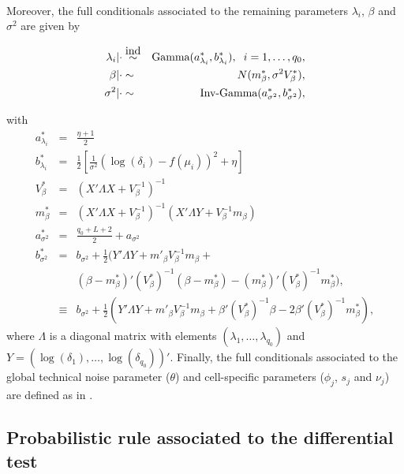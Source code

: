 \\

Moreover, the full conditionals associated to the remaining parameters $\lambda_i$, $\beta$ and $\sigma^2$ are given by 

\begin{eqnarray}
\lambda_i|\cdot & \stackrel{\mbox{ind}}{\sim} & \text{Gamma}(a^*_{\lambda_i},b^*_{\lambda_i}), \hspace{0.2cm} i = 1, \ldots, q_0, \\
\beta|\cdot & \sim & N(m^*_{\beta}, \sigma^2 V^*_{\beta}), \\
\sigma^2|\cdot & \sim & \text{Inv-Gamma}(a^*_{\sigma^2},b^*_{\sigma^2}),
\end{eqnarray} 

with \begin{eqnarray}
a^*_{\lambda_i} & = & \frac{\eta+1}{2} \\
b^*_{\lambda_i} & = & \frac{1}{2}\left[\frac{1}{\sigma^2}(\log(\delta_i)-f(\mu_i))^2+\eta\right] \\
V^*_{\beta} & = & (X' \Lambda X + V_\beta^{-1})^{-1} \\
m^*_{\beta} & = & (X' \Lambda X+V_\beta^{-1})^{-1}(X' \Lambda Y + V_\beta^{-1}m_\beta{}) \\
a^*_{\sigma^2} & = & \frac{q_0+L+2}{2}+a_{\sigma^2}\\
b^*_{\sigma^2} & = & b_{\sigma^2}+\frac{1}{2}(Y'\Lambda Y+ m'_{\beta} V_\beta^{-1} m_\beta+ \nonumber \\
&  &(\beta-m^*_{\beta})' (V^*_{\beta})^{-1} (\beta-m^*_{\beta}) - (m^*_{\beta})' (V^*_{\beta})^{-1} m^*_{\beta}),  \\
& \equiv & b_{\sigma^2}+\frac{1}{2}(Y'\Lambda Y+ m'_{\beta} V_\beta^{-1} m_\beta + \beta' (V^*_{\beta})^{-1} \beta - 2 \beta' (V^*_{\beta})^{-1} m^*_{\beta} ),
\end{eqnarray} where $\Lambda$ is a diagonal matrix with elements $(\lambda_1, \ldots, \lambda_{q_0})$ and $Y = (\log(\delta_1), \ldots, \log(\delta_{q_0}))'$. Finally, the full conditionals associated to the global technical noise parameter ($\theta$) and cell-specific parameters ($\phi_j$, $s_j$ and $\nu_j$) are defined as in \cite{Vallejos2016a}.

\subsection{Probabilistic rule associated to the differential test} \label{sec:differentialtest}

